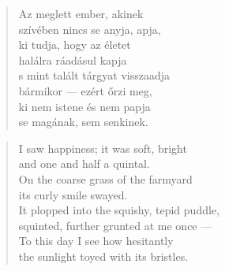 \bigskip


\begin{verse}
  Az meglett ember, akinek \\
  szívében nincs se anyja, apja, \\
  ki tudja, hogy az életet \\
  halálra ráadásul kapja \\
  s mint talált tárgyat visszaadja \\
  bármikor --- ezért őrzi meg, \\
  ki nem istene és nem papja \\
  se magának, sem senkinek.
\end{verse}

\newpage

\vspace*{-15mm}
\centeredornament





\begin{verse}
  I saw happiness; it was soft, bright \\
  and one and half a quintal. \\
  On the coarse grass of the farmyard \\
  its curly smile swayed. \\
  It plopped into the squishy, tepid puddle, \\
  squinted, further grunted at me once --- \\
  To this day I see how hesitantly \\
  the sunlight toyed with its bristles.
\end{verse}

\bigskip




